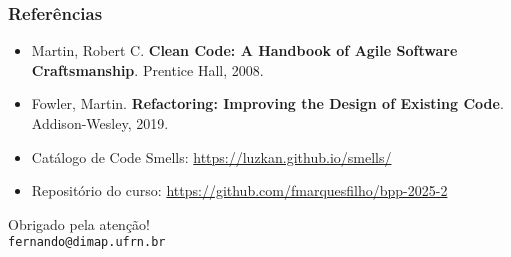 \documentclass[aspectratio=169]{beamer}
\begin{document}
\begin{frame}
\frametitle{Referências}

\begin{itemize}
    \item Martin, Robert C. \textbf{Clean Code: A Handbook of Agile Software Craftsmanship}. Prentice Hall, 2008.
    \item Fowler, Martin. \textbf{Refactoring: Improving the Design of Existing Code}. Addison-Wesley, 2019.
    \item Catálogo de Code Smells: \url{https://luzkan.github.io/smells/}
    \item Repositório do curso: \url{https://github.com/fmarquesfilho/bpp-2025-2}
\end{itemize}

\vspace{1cm}
\begin{center}
\Large
Obrigado pela atenção!\\
\vspace{0.5cm}
\normalsize
\texttt{fernando@dimap.ufrn.br}
\end{center}
\end{frame}
\end{document}
